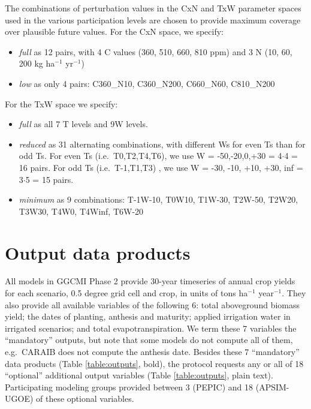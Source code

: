 \documentclass[gmd, manuscript]{copernicus} %
\begin{document}
The combinations of perturbation values in the CxN and TxW parameter spaces used in the various participation levels are chosen to provide maximum coverage over plausible future values. For the CxN space, we specify:
\begin{itemize}
  \item \textit{full} as 12 pairs, with 4 C values (360, 510, 660, 810 ppm) and 3 N (10, 60, 200 kg ha$^{-1}$ yr$^{-1}$)
  \item \textit{low} as only 4 pairs: C360\_N10, C360\_N200, C660\_N60, C810\_N200
\end{itemize}
    
For the TxW space we specify:
\begin{itemize}
  \item \textit{full} as all 7 T levels and 9W levels.
  \item \textit{reduced} as 31 alternating combinations, with different Ws for even Ts than for odd Ts. For even Ts (i.e.\ T0,T2,T4,T6), we use W = -50,-20,0,+30 = 4$\cdot$4 = 16 pairs. For odd Ts (i.e.\ T-1,T1,T3) , we use W = -30, -10, +10, +30, inf = 3$\cdot$5 = 15 pairs.
  \item \textit{minimum} as 9 combinations: T-1W-10, T0W10, T1W-30, T2W-50, T2W20, T3W30, T4W0, T4Winf, T6W-20
\end{itemize}

\section{Output data products}
All models in GGCMI Phase 2 provide 30-year timeseries of annual crop yields 
for each scenario, 0.5 degree grid cell and crop, in units of tons ha$^{-1}$ year$^{-1}$. They also provide all available variables of the following 6: total aboveground biomass yield; the dates of planting, anthesis and maturity; applied irrigation water in irrigated scenarios; and total evapotranspiration.  We term these 7 variables the ``mandatory'' outputs, but note that some models do not compute all of them, e.g.\ CARAIB does not compute the anthesis date.
Besides these 7 ``mandatory'' data products (Table \ref{table:outputs}, bold), the protocol requests any or all of 18 ``optional'' additional output variables (Table \ref{table:outputs}, plain text).
Participating modeling groups provided between 3 (PEPIC) and 18 (APSIM-UGOE) of these optional variables. 
\end{document}

